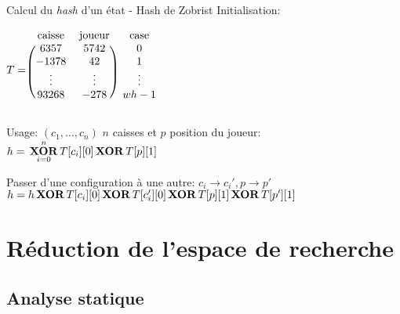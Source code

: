         \begin{frame}{Calcul du \textit{hash} d'un état - Hash de Zobrist}
            Initialisation:

            \begin{center}
                $T=\begin{blockarray}{ccc}
                        \text{caisse} & \text{joueur} & \text{case} \\
                    \begin{block}{(cc)c}
                        6357   & 5742   & 0      \\
                        -1378  & 42     & 1      \\
                        \vdots & \vdots & \vdots \\
                        93268  & -278   & wh - 1 \\
                    \end{block}
                \end{blockarray}$
            \end{center}

            Usage:
            $(c_1, ..., c_n)$ $n$ caisses et $p$ position du joueur:
            $h = \underset{i=0}{\overset{n}{\, \text{\textbf{XOR}} \,}} T[c_i][0] \, \text{\textbf{XOR}} \, T[p][1]$

            Passer d'une configuration à une autre:
            $c_i \rightarrow c_i', p \rightarrow p'$
            $h = h \, \text{\textbf{XOR}} \, T[c_i][0] \, \text{\textbf{XOR}} \, T[c_i'][0] \, \text{\textbf{XOR}} \, T[p][1] \, \text{\textbf{XOR}} \, T[p'][1]$
        \end{frame}

    \section{Réduction de l'espace de recherche}

        \subsection{Analyse statique}

